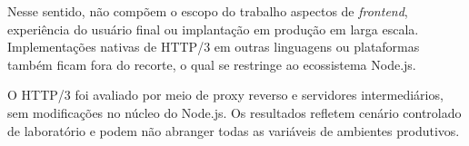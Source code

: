 Nesse sentido, não compõem o escopo do trabalho aspectos de \textit{frontend}, experiência do usuário final ou implantação em produção em larga escala. Implementações nativas de HTTP/3 em outras linguagens ou plataformas também ficam fora do recorte, o qual se restringe ao ecossistema Node.js.

O HTTP/3 foi avaliado por meio de proxy reverso e servidores intermediários, sem modificações no núcleo do Node.js. Os resultados refletem cenário controlado de laboratório e podem não abranger todas as variáveis de ambientes produtivos.

